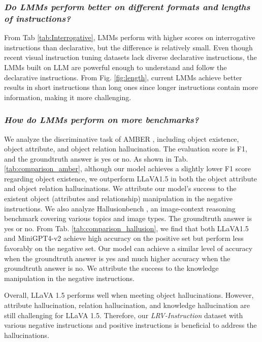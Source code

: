 \subsubsection{\textit{Do LMMs perform better on different formats and lengths of instructions? }}

From Tab \ref{tab:Interrogative}, LMMs perform with higher scores on interrogative instructions than declarative, but the difference is relatively small. Even though recent visual instruction tuning datasets lack diverse declarative instructions, the LMMs built on LLM are powerful enough to understand and follow the declarative instructions. From Fig. \ref{fig:length}, current LMMs achieve better results in short instructions than long ones since longer instructions contain more information, making it more challenging. 


\subsubsection{\textit{How do LMMs perform on more benchmarks?}}
We analyze the discriminative task of AMBER \citep{wang2023llm}, including object existence, object attribute, and object relation hallucination. The evaluation score is F1, and the groundtruth answer is yes or no. As shown in Tab. \ref{tab:comparison_amber}, although our model achieves a slightly lower F1 score regarding object existence, we outperform LLaVA1.5 in both the object attribute and object relation hallucinations. We attribute our model’s success to the existent object (attributes and relationship) manipulation in the negative instructions. We also analyze Hallusionbench \citep{liu2023hallusionbench}, an image-context reasoning benchmark covering various topics and image types. The groundtruth answer is yes or no. From Tab. \ref{tab:comparison_hallusion}, we find that both LLaVA1.5 and MiniGPT4-v2 \citep{chen2023minigpt} achieve high accuracy on the positive set but perform less favorably on the negative set. Our model can achieve a similar level of accuracy when the groundtruth answer is yes and much higher accuracy when the groundtruth answer is no. We attribute the success to the knowledge manipulation in the negative instructions.

Overall, LLaVA 1.5 performs well when meeting object hallucinations. However, attribute hallucination, relation hallucination, and knowledge hallucination are still challenging for LLaVA 1.5. Therefore, our \textit{LRV-Instruction} dataset with various negative instructions and positive instructions is beneficial to address the hallucinations. 

